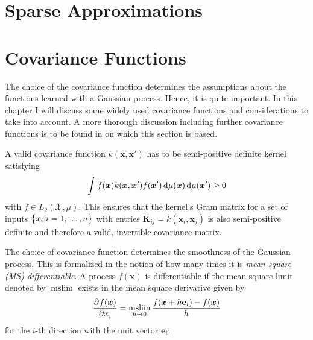 \documentclass[11pt,a4paper,twoside,BCOR=15mm]{scrreprt}
\newcommand{\vc}[1]{\bm{#1}}
\newcommand{\vcc}[1]{\textbf{#1}}
\newcommand{\mat}[1]{\bm{#1}}
\DeclareMathOperator*{\mslim}{mslim}
\newcommand{\newterm}[1]{\emph{#1}}
\begin{document}
\section{Sparse Approximations}

\section{Covariance Functions}\label{sec:covfn}
The choice of the covariance function determines the assumptions about the 
functions learned with a Gaussian process. Hence, it is quite important. In this 
chapter I will discuss some widely used covariance functions and considerations 
to take into account. A more thorough discussion including further covariance 
functions is to be found in \textcite[Chapter 4]{Rasmussen:2006vz} on which this 
section is based.

A valid covariance function $k(\vc x, \vc x')$ has to be semi-positive definite 
kernel \parencite{Cressie:1993uu} satisfying
\begin{equation}
    \int f(\vc x) k(\vc x, \vc x') f(\vc x') \dif \mu(\vc x) \dif \mu(\vc x') 
    \geq 0
\end{equation}
with $f \in L_2(\mathcal{X}, \mu)$. This ensures that the kernel's Gram matrix 
for a set of inputs $\cbr{x_i | i = 1, \dots, n}$ with entries $\mat K_{ij} 
= k(\vc x_i, \vc x_j)$ is also semi-positive definite and therefore a valid, 
invertible covariance matrix.

The choice of covariance function determines the smoothness of the Gaussian 
process. This is formalized in the notion of how many times it is \newterm{mean 
    square (MS) differentiable}. A process $f(\vc x)$ is differentiable if the
mean square limit denoted by $\mslim$ exists in the mean square derivative given 
by
\begin{equation}
    \dpd{f(\vc x)}{x_i} = \mslim_{h \rightarrow 0} \frac{f(\vc x + h\vcc e_i) 
    - f(\vc x)}{h}
\end{equation}
for the $i$-th direction with the unit vector $\vcc e_i$.

\end{document}
